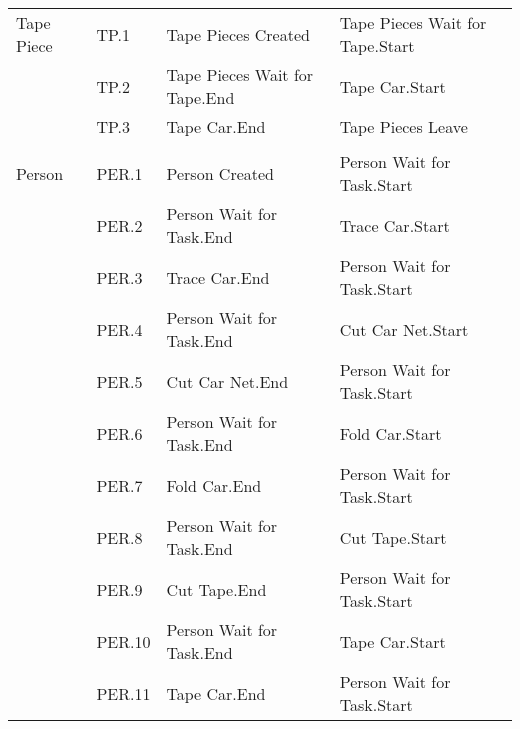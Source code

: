 \begin{longtable}{p{2.4cm}>{\raggedright\arraybackslash}p{1.2cm}>{\raggedright\arraybackslash}p{5.9cm}>{\raggedright\arraybackslash}p{5.9cm}}
Tape Piece & TP.1 & Tape Pieces Created & Tape Pieces Wait for Tape.Start \\
           & TP.2 & Tape Pieces Wait for Tape.End & Tape Car.Start \\
           & TP.3 & Tape Car.End & Tape Pieces Leave \\
     &      &              &              \\
Person & PER.1 & Person Created & Person Wait for Task.Start \\
       & PER.2 & Person Wait for Task.End & Trace Car.Start \\
       & PER.3 & Trace Car.End & Person Wait for Task.Start \\
       & PER.4 & Person Wait for Task.End & Cut Car Net.Start \\
       & PER.5 & Cut Car Net.End & Person Wait for Task.Start \\
       & PER.6 & Person Wait for Task.End & Fold Car.Start \\
       & PER.7 & Fold Car.End & Person Wait for Task.Start \\
       & PER.8 & Person Wait for Task.End & Cut Tape.Start \\
       & PER.9 & Cut Tape.End & Person Wait for Task.Start \\
       & PER.10 & Person Wait for Task.End & Tape Car.Start \\
       & PER.11 & Tape Car.End & Person Wait for Task.Start \\\bottomrule
\end{longtable}
